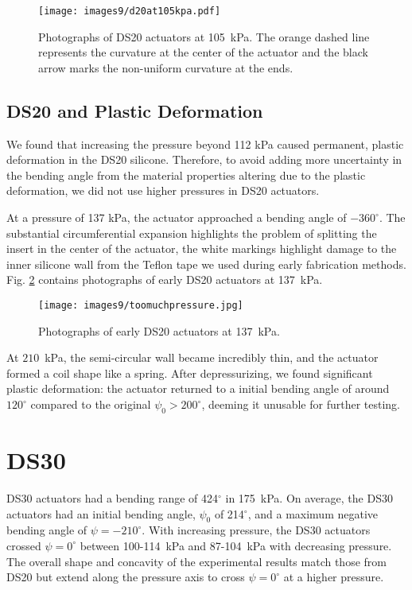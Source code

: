 \begin{figure}[!ht]
    \centering
     \texttt{[image: images9/d20at105kpa.pdf]}
    \caption{Photographs of DS20 actuators at 105~kPa. The orange dashed line represents the curvature at the center of the actuator and the black arrow marks the non-uniform curvature at the ends.}
    \label{fig:d20at105kpa}
\end{figure}

\subsection{DS20 and Plastic Deformation}

We found that increasing the pressure beyond 112 kPa caused permanent, plastic deformation in the DS20 silicone. Therefore, to avoid adding more uncertainty in the bending angle from the material properties altering due to the plastic deformation, we did not use higher pressures in DS20 actuators. 

At a pressure of 137 kPa, the actuator approached a bending angle of $-360^\circ$. The substantial circumferential expansion highlights the problem of splitting the insert in the center of the actuator, the white markings highlight damage to the inner silicone wall from the Teflon tape we used during early fabrication methods. Fig. \ref{fig:toomuchpressure} contains photographs of early DS20 actuators at 137~kPa.  
\\
\begin{figure}[!ht]
    \centering
     \texttt{[image: images9/toomuchpressure.jpg]}
    \caption{Photographs of early DS20 actuators at 137~kPa.}
    \label{fig:toomuchpressure}
\end{figure}

At $210$~kPa, the semi-circular wall became incredibly thin, and the actuator formed a coil shape like a spring. After depressurizing, we found significant plastic deformation: the actuator returned to a initial bending angle of around $120^\circ$ compared to the original $\psi_0>200^\circ$, deeming it unusable for further testing. 

\clearpage
\section{DS30}

DS30 actuators had a bending range of 424$^\circ$ in 175~kPa. On average, the DS30 actuators had an initial bending angle, $\psi_0$ of 214$^\circ$, and a maximum negative bending angle of $\psi=-210^\circ$. With increasing pressure, the DS30 actuators crossed $\psi=0^\circ$ between 100-114~kPa and 87-104~kPa with decreasing pressure. The overall shape and concavity of the experimental results match those from DS20 but extend along the pressure axis to cross $\psi=0^\circ$ at a higher pressure. 

